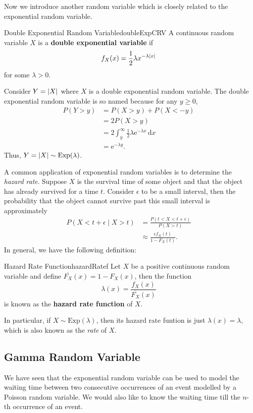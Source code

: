\documentclass[math]{amznotes}
\theoremstyle{remark}
\newcommand{\0}{\mathbf{0}}
\newcommand{\1}{\mathbf{1}}
\begin{document}
Now we introduce another random variable which is closely related to the exponential random variable.
\begin{dfnbox}{Double Exponential Random Variable}{doubleExpCRV}
    A continuous random variable $X$ is a {\color{red} \textbf{double exponential variable}} if 
    \begin{equation*}
        f_X(x) = \frac{1}{2}\lambda x^{-\lambda{\left\lvert {x} \right\rvert}}
    \end{equation*}
    for some $\lambda > 0$.
\end{dfnbox}
Consider $Y = {\left\lvert {X} \right\rvert}$ where $X$ is a double exponential random variable. The double exponential random variable is so named because for any $y \geq 0$,
\begin{align*}
    P(Y > y) & = P(X > y) + P(X < -y) \\
    & = 2P(X > y) \\
    & = 2\int_{y}^{\infty}\!\frac{1}{2}\lambda \mathrm{e}^{-\lambda x}\,\mathrm{d}x \\
    & = \mathrm{e}^{-\lambda y}.
\end{align*}
Thus, $Y = {\left\lvert {X} \right\rvert} \sim \mathrm{Exp}(\lambda)$.

A common application of exponential random variables is to determine the \textit{hazard rate}. Suppose $X$ is the survival time of some object and that the object has already survived for a time $t$. Consider $\epsilon$ to be a small interval, then the probability that the object cannot survive past this small interval is approximately
\begin{align*}
    P(X < t + \epsilon \mid X > t) & = \frac{P(t < X < t + \epsilon)}{P(X > t)} \\
    & \approx \frac{\epsilon f_X(t)}{1 - F_X(t)}.
\end{align*}
In general, we have the following definition:
\begin{dfnbox}{Hazard Rate Function}{hazardRatef}
    Let $X$ be a positive continuous random variable and define $\overline{F_X}(x) = 1 - F_X(x)$, then the function
    \begin{equation*}
        \lambda(x) = \frac{f_X(x)}{\overline{F_X}(x)}
    \end{equation*}
    is known as the {\color{red} \textbf{hazard rate function}} of $X$.
\end{dfnbox}
In particular, if $X \sim \mathrm{Exp}(\lambda)$, then its hazard rate funtion is just $\lambda(x) = \lambda$, which is also known as the \textit{rate} of $X$.

\subsection{Gamma Random Variable}
We have seen that the exponential random variable can be used to model the waiting time between two consecutive occurrences of an event modelled by a Poisson random variable. We would also like to know the waiting time till the $n$-th occurrence of an event.
\end{document}
